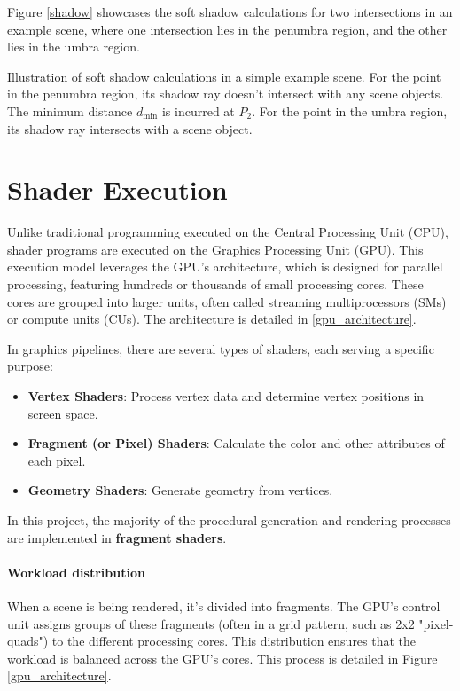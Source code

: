 Figure \ref{shadow} showcases the soft shadow calculations for two intersections in an example scene, where one intersection lies in the penumbra region, and the other lies in the umbra region.

{Illustration of soft shadow calculations in a simple example scene. For the point in the penumbra region, its shadow ray doesn't intersect with any scene objects. The minimum distance $d_{\text{min}}$ is incurred at $P_2$. For the point in the umbra region, its shadow ray intersects with a scene object.}


\section{Shader Execution}
\label{GPU}

Unlike traditional programming executed on the Central Processing Unit (CPU), shader programs are executed on the Graphics Processing Unit (GPU). This execution model leverages the GPU’s architecture, which is designed for parallel processing, featuring hundreds or thousands of small processing cores. These cores are grouped into larger units, often called streaming multiprocessors (SMs) or compute units (CUs). The architecture is detailed in \ref{gpu_architecture}.

In graphics pipelines, there are several types of shaders, each serving a specific purpose:
\begin{itemize}
    \item \textbf{Vertex Shaders}: Process vertex data and determine vertex positions in screen space.
    \item \textbf{Fragment (or Pixel) Shaders}: Calculate the color and other attributes of each pixel.
    \item \textbf{Geometry Shaders}: Generate geometry from vertices.
\end{itemize}

In this project, the majority of the procedural generation and rendering processes are implemented in \textbf{fragment shaders}.

\paragraph{Workload distribution}
When a scene is being rendered, it's divided into fragments. The GPU's control unit assigns groups of these fragments (often in a grid pattern, such as 2x2 "pixel-quads") to the different processing cores. This distribution ensures that the workload is balanced across the GPU's cores. This process is detailed in Figure \ref{gpu_architecture}.

